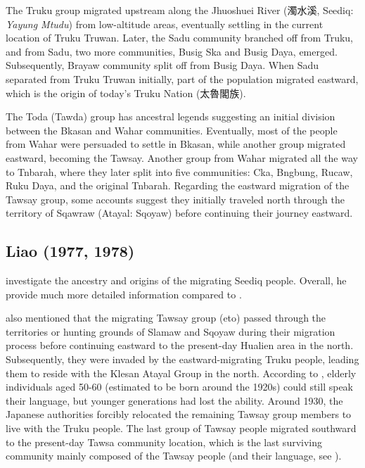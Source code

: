 The Truku group migrated upstream along the Jhuoshuei River (濁水溪, Seediq: \textit{Yayung Mtudu}) from low-altitude areas, eventually settling in the current location of Truku Truwan. Later, the Sadu community branched off from Truku, and from Sadu, two more communities, Busig Ska and Busig Daya, emerged. Subsequently, Brayaw community split off from Busig Daya. When Sadu separated from Truku Truwan initially, part of the population migrated eastward, which is the origin of today's Truku Nation (太魯閣族).

The Toda (Tawda) group has ancestral legends suggesting an initial division between the Bkasan and Wahar communities. Eventually, most of the people from Wahar were persuaded to settle in Bkasan, while another group migrated eastward, becoming the Tawsay. Another group from Wahar migrated all the way to Tnbarah, where they later split into five communities: Cka, Bngbung, Rucaw, Ruku Daya, and the original Tnbarah. Regarding the eastward migration of the Tawsay group, some accounts suggest they initially traveled north through the territory of Sqawraw (Atayal: Sqoyaw) before continuing their journey eastward.


\subsection{Liao (1977, 1978)}

\textcite{liao1977Sedtheruy,liao1978Sedtheruy} investigate the ancestry and origins of the migrating Seediq people. Overall, he provide much more detailed information compared to \textcite{utsurikawaetal1935}.

\textcite{liao1977Sedtheruy} also mentioned that the migrating Tawsay group (\acl{eto}) passed through the territories or hunting grounds of Slamaw and Sqoyaw during their migration process before continuing eastward to the present-day Hualien area in the north. Subsequently, they were invaded by the eastward-migrating Truku people, leading them to reside with the Klesan Atayal Group in the north. According to \textcite[65]{liao1977Sedtheruy}, elderly individuals aged 50-60 (estimated to be born around the 1920s) could still speak their language, but younger generations had lost the ability. Around 1930, the Japanese authorities forcibly relocated the remaining Tawsay group members to live with the Truku people. The last group of Tawsay people migrated southward to the present-day Tawsa community location, which is the last surviving community mainly composed of the Tawsay people (and their language, see \cite{lee2015tawsa}).


